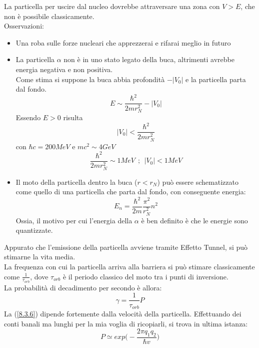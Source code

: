 \documentclass[twoside]{article}
\begin{document}
La particella per uscire dal nucleo dovrebbe attraversare una zona con $V>E$, che non è possibile classicamente.
\\
Osservazioni:
\begin{itemize}
    \item Una roba sulle forze nucleari che apprezzerai e rifarai meglio in futuro
    \item La particella $\alpha$ non è in uno stato legato della buca, altrimenti avrebbe energia negativa e non positiva.
    \\
    Come stima si suppone la buca abbia profondità $-|V_0|$ e la particella parta dal fondo.
    \begin{equation}
        E\sim \frac{\hbar^2}{2mr_N ^2}-|V_0|
    \end{equation}
    Essendo $E>0$ risulta
    \begin{equation*}
        |V_0|<\frac{\hbar^2}{2mr_N ^2}
    \end{equation*}
    con $\hbar c = 200 MeV$ e $mc^2 \sim 4 GeV$
    \begin{equation*}
        \frac{\hbar^2}{2mr_N ^2}\sim 1 MeV \ \ ; \ \ |V_0|<1 MeV
    \end{equation*}
    
    \item Il moto della particella dentro la buca ($r<r_N$) può essere schematizzato come quello di una particella che parta dal fondo, con conseguente energia:
    \begin{equation}
        E_n=\frac{\hbar^2}{2m}\frac{\pi^2}{r_N ^2}n^2
    \end{equation}
    Ossia, il motivo per cui l'energia della $\alpha$ è ben definito è che le energie sono quantizzate.
\end{itemize}

Appurato che l'emissione della particella avviene tramite Effetto Tunnel, si può stimarne la vita media.
\\
La frequenza con cui la particella arriva alla barriera si può stimare classicamente come $\frac{1}{\tau_{orb}}$, dove $\tau_{orb}$ è il periodo classico del moto tra i punti di inversione.
\\
La probabilità di decadimento per secondo è allora:
\begin{equation} \label{8.3.6}
    \gamma=\frac{1}{\tau_{orb}}P
\end{equation}
La (\ref{8.3.6}) dipende fortemente dalla velocità della particella. Effettuando dei conti banali ma lunghi per la mia voglia di ricopiarli, si trova in ultima istanza:
\begin{equation}
    P\simeq exp\biggl(-\frac{2\pi q_1 q_2}{\hbar v}\biggr)
\end{equation}
\end{document}
